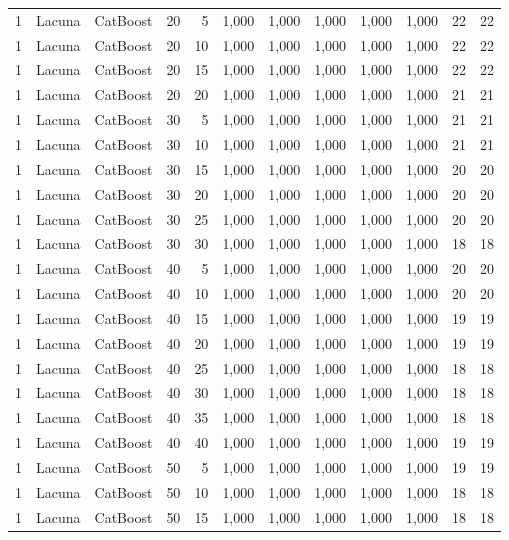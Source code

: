 \begin{longtable}{@{}rllrrrrrrrrr@{}}
1 & Lacuna & CatBoost & 20 & 5 & 1,000 & 1,000 & 1,000 & 1,000 & 1,000 & 22 & 22 \\
1 & Lacuna & CatBoost & 20 & 10 & 1,000 & 1,000 & 1,000 & 1,000 & 1,000 & 22 & 22 \\
1 & Lacuna & CatBoost & 20 & 15 & 1,000 & 1,000 & 1,000 & 1,000 & 1,000 & 22 & 22 \\
1 & Lacuna & CatBoost & 20 & 20 & 1,000 & 1,000 & 1,000 & 1,000 & 1,000 & 21 & 21 \\
1 & Lacuna & CatBoost & 30 & 5 & 1,000 & 1,000 & 1,000 & 1,000 & 1,000 & 21 & 21 \\
1 & Lacuna & CatBoost & 30 & 10 & 1,000 & 1,000 & 1,000 & 1,000 & 1,000 & 21 & 21 \\
1 & Lacuna & CatBoost & 30 & 15 & 1,000 & 1,000 & 1,000 & 1,000 & 1,000 & 20 & 20 \\
1 & Lacuna & CatBoost & 30 & 20 & 1,000 & 1,000 & 1,000 & 1,000 & 1,000 & 20 & 20 \\
1 & Lacuna & CatBoost & 30 & 25 & 1,000 & 1,000 & 1,000 & 1,000 & 1,000 & 20 & 20 \\
1 & Lacuna & CatBoost & 30 & 30 & 1,000 & 1,000 & 1,000 & 1,000 & 1,000 & 18 & 18 \\
1 & Lacuna & CatBoost & 40 & 5 & 1,000 & 1,000 & 1,000 & 1,000 & 1,000 & 20 & 20 \\
1 & Lacuna & CatBoost & 40 & 10 & 1,000 & 1,000 & 1,000 & 1,000 & 1,000 & 20 & 20 \\
1 & Lacuna & CatBoost & 40 & 15 & 1,000 & 1,000 & 1,000 & 1,000 & 1,000 & 19 & 19 \\
1 & Lacuna & CatBoost & 40 & 20 & 1,000 & 1,000 & 1,000 & 1,000 & 1,000 & 19 & 19 \\
1 & Lacuna & CatBoost & 40 & 25 & 1,000 & 1,000 & 1,000 & 1,000 & 1,000 & 18 & 18 \\
1 & Lacuna & CatBoost & 40 & 30 & 1,000 & 1,000 & 1,000 & 1,000 & 1,000 & 18 & 18 \\
1 & Lacuna & CatBoost & 40 & 35 & 1,000 & 1,000 & 1,000 & 1,000 & 1,000 & 18 & 18 \\
1 & Lacuna & CatBoost & 40 & 40 & 1,000 & 1,000 & 1,000 & 1,000 & 1,000 & 19 & 19 \\
1 & Lacuna & CatBoost & 50 & 5 & 1,000 & 1,000 & 1,000 & 1,000 & 1,000 & 19 & 19 \\
1 & Lacuna & CatBoost & 50 & 10 & 1,000 & 1,000 & 1,000 & 1,000 & 1,000 & 18 & 18 \\
1 & Lacuna & CatBoost & 50 & 15 & 1,000 & 1,000 & 1,000 & 1,000 & 1,000 & 18 & 18 \\

\end{longtable}

